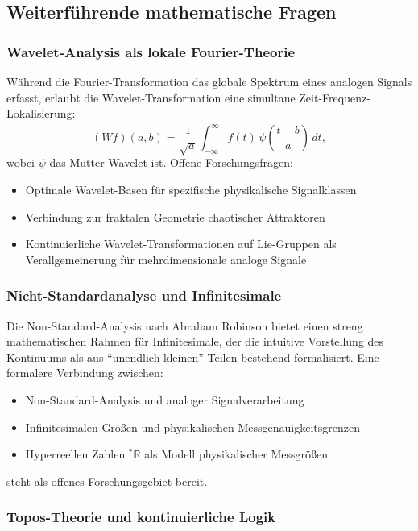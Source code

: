 ﻿\documentclass[a4paper,12pt]{article}
\theoremstyle{definition}
\begin{document}
\subsection{Weiterführende mathematische Fragen}

\subsubsection{Wavelet-Analysis als lokale Fourier-Theorie}

Während die Fourier-Transformation das globale Spektrum eines analogen Signals
erfasst, erlaubt die Wavelet-Transformation eine simultane Zeit-Frequenz-Lokalisierung:
\[
(Wf)(a,b) = \frac{1}{\sqrt{a}} \int_{-\infty}^\infty f(t) \, \overline{\psi\!\left(\frac{t-b}{a}\right)} \, dt,
\]
wobei $\psi$ das Mutter-Wavelet ist.  Offene Forschungsfragen:
\begin{itemize}
    \item Optimale Wavelet-Basen für spezifische physikalische Signalklassen
    \item Verbindung zur fraktalen Geometrie chaotischer Attraktoren
    \item Kontinuierliche Wavelet-Transformationen auf Lie-Gruppen
          als Verallgemeinerung für mehrdimensionale analoge Signale
\end{itemize}

\subsubsection{Nicht-Standardanalyse und Infinitesimale}

Die Non-Standard-Analysis nach Abraham Robinson \citep{Robinson1966} bietet
einen streng mathematischen Rahmen für Infinitesimale, der die intuitive
Vorstellung des Kontinuums als aus ``unendlich kleinen'' Teilen bestehend
formalisiert.  Eine formalere Verbindung zwischen:
\begin{itemize}
    \item Non-Standard-Analysis und analoger Signalverarbeitung
    \item Infinitesimalen Größen und physikalischen Messgenauigkeitsgrenzen
    \item Hyperreellen Zahlen ${}^*\mathbb{R}$ als Modell physikalischer Messgrößen
\end{itemize}
steht als offenes Forschungsgebiet bereit.

\subsubsection{Topos-Theorie und kontinuierliche Logik}
\end{document}
